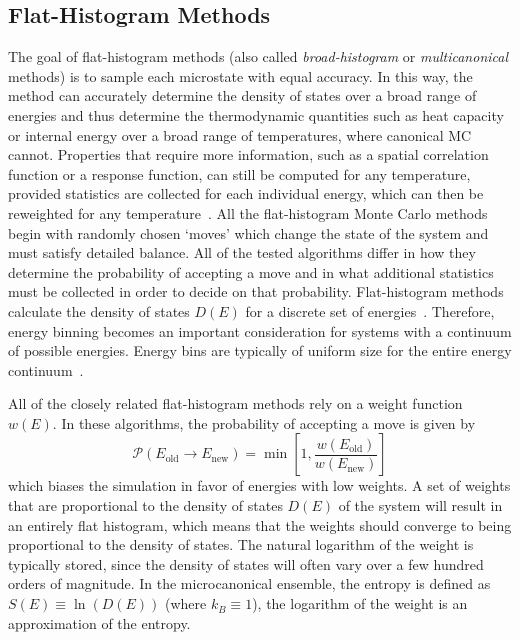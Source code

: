 \subsection{Flat-Histogram Methods}\label{fhm}
The goal of flat-histogram methods (also called \emph{broad-histogram} or
\emph{multicanonical} methods) is to sample each microstate with equal
accuracy. In this way, the method can accurately determine the density of
states over a broad range of energies and thus determine the thermodynamic
quantities such as heat capacity or internal energy over a broad range of
temperatures, where canonical MC cannot. Properties that require more
information, such as a spatial correlation function or a response function, can
still be computed for any temperature, provided statistics are collected for
each individual energy, which can then be reweighted for any
temperature~\cite{panagiotopoulos1998phase, panagiotopoulos2000monte,
errington2003direct}. All the flat-histogram Monte Carlo methods begin with
randomly chosen `moves' which change the state of the system and must satisfy
detailed balance. All of the tested algorithms differ in how they determine the
probability of accepting a move and in what additional statistics must be
collected in order to decide on that probability. Flat-histogram methods
calculate the density of states $D(E)$ for a discrete set of
energies~\cite{wang2001determining, dayal2004performance, troyer2003flat,
trebst2004optimizing}. Therefore, energy binning becomes an important
consideration for systems with a continuum of possible energies. Energy bins
are typically of uniform size for the entire energy
continuum~\cite{fasnacht2004adaptive}.

All of the closely related flat-histogram
methods rely on a weight function $w(E)$.  In these
algorithms, the probability of accepting a move is given by
\begin{equation}
	\mathcal{P}(E_\text{old} \rightarrow E_\text{new})
	= \min\left[1,\frac{w(E_\text{old})}{w(E_\text{new})}\right]
\end{equation}
which biases the simulation in favor of energies with low weights.  A set of
weights that are proportional to the density of states $D(E)$ of the system will
result in an entirely flat histogram, which means that the weights should
converge to being proportional to the density of states.  The natural logarithm
of the weight is typically stored, since the density of states will often vary
over a few hundred orders of magnitude. In the microcanonical ensemble, the
entropy is defined as $S(E) \equiv \ln(D(E))$ (where $k_B \equiv 1$), the
logarithm of the weight is an approximation of the entropy.

